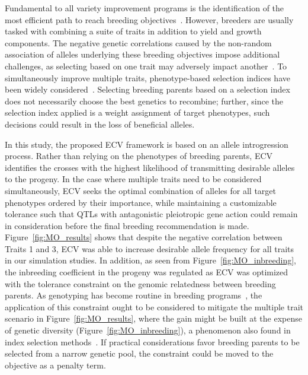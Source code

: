 \documentclass[12pt, a4paper, bibliography=totoc]{scrartcl}
\begin{document}
Fundamental to all variety improvement programs is the identification of the most efficient path to reach breeding objectives~\citep{bernardo2002breeding, akdemir2019multi}. However, breeders are usually tasked with combining a suite of traits in addition to yield and growth components. The negative genetic correlations caused by the non-random association of alleles underlying these breeding objectives impose additional challenges, as selecting based on one trait may adversely impact another~\citep{lynch1998genetics}. To simultaneously improve multiple traits, phenotype-based selection indices have been widely considered~\citep{hazel1942efficiency, hazel1994selection, villanueva1997optimization, jannink2000index, moeinizade2020multi}. Selecting breeding parents based on a selection index does not necessarily choose the best genetics to recombine; further, since the selection index applied is a weight assignment of target phenotypes, such decisions could result in the loss of beneficial alleles. 

In this study, the proposed ECV framework is based on an allele introgression process. Rather than relying on the phenotypes of breeding parents, ECV identifies the crosses with the highest likelihood of transmitting desirable alleles to the progeny. In the case where multiple traits need to be considered simultaneously, ECV seeks the optimal combination of alleles for all target phenotypes ordered by their importance, while maintaining a customizable tolerance  such that QTLs with antagonistic pleiotropic gene action could remain in consideration before the final breeding recommendation is made. Figure~\ref{fig:MO_results} shows that despite the negative correlation between Traits 1 and 3, ECV was able to increase desirable allele frequency for all traits in our simulation studies. In addition, as seen from Figure~\ref{fig:MO_inbreeding}, the inbreeding coefficient in the progeny was regulated as ECV was optimized with the tolerance constraint on the genomic relatedness between breeding parents. As genotyping has become routine in breeding programs~\citep{hayes2010genome, bentley2022frontiers}, the application of this constraint ought to be considered to mitigate the multiple trait scenario in Figure~\ref{fig:MO_results}, where the gain might be built at the expense of genetic diversity (Figure~\ref{fig:MO_inbreeding}), a phenomenon also found in index selection methods~\citep{akdemir2019multi}. If practical considerations favor breeding parents to be selected from a narrow genetic pool, the constraint could be moved to the objective as a penalty term. 
\end{document}
